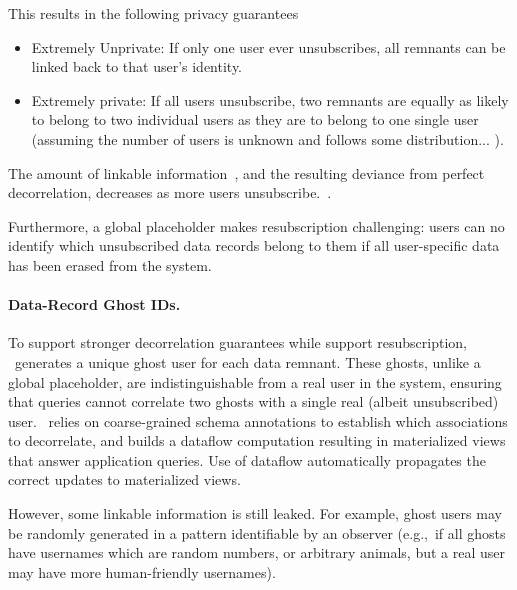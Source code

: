 This results in the following privacy guarantees~
\begin{itemize}
    \item Extremely Unprivate: If only one user ever unsubscribes, all remnants can be linked back
        to that user's identity.
    \item Extremely private: If all users unsubscribe, two remnants are equally as likely to belong
        to two individual users as they are to belong to one single user (assuming the number of
        users is unknown and follows some distribution... ).
\end{itemize}
The amount of linkable information~, and the resulting deviance from
perfect decorrelation, decreases as more users unsubscribe.~.

Furthermore, a global placeholder makes resubscription challenging: users can no identify which
unsubscribed data records belong to them if all user-specific data has been erased from the
system. 

\paragraph{Data-Record Ghost IDs.}
To support stronger decorrelation guarantees while support resubscription, \sys~generates a unique
ghost user for each data remnant. These ghosts, unlike a global placeholder, are
indistinguishable from a real user in the system, ensuring that queries cannot correlate two ghosts
with a single real (albeit unsubscribed) user. 
\sys~relies on coarse-grained schema annotations to
establish which associations to decorrelate, and builds a dataflow computation resulting in
materialized views that answer application queries. Use of dataflow automatically propagates the
correct updates to materialized views.

However, some linkable information is still leaked. For example, ghost users may be randomly
generated in a pattern identifiable by an observer (e.g.,\ if all ghosts have usernames which are
random numbers, or arbitrary animals, but a real user may have more human-friendly usernames).


